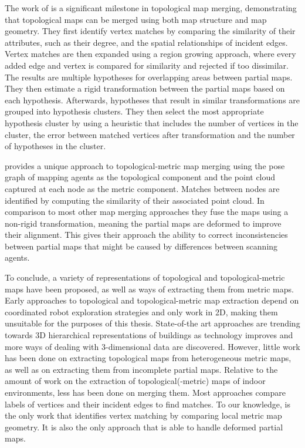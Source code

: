 The work of \citet{huang_topological_2005} is a significant milestone in topological map merging, demonstrating that topological maps can be merged using both map structure and map geometry. They first identify vertex matches by comparing the similarity of their attributes, such as their degree, and the spatial relationships of incident edges. Vertex matches are then expanded using a region growing approach, where every added edge and vertex is compared for similarity and rejected if too dissimilar. The results are multiple hypotheses for overlapping areas between partial maps. They then estimate a rigid transformation between the partial maps based on each hypothesis. Afterwards, hypotheses that result in similar transformations are grouped into hypothesis clusters. They then select the most appropriate hypothesis cluster by using a heuristic that includes the number of vertices in the cluster, the error between matched vertices after transformation and the number of hypotheses in the cluster.

\citet{bonanni_3-d_2017} provides a unique approach to topological-metric map merging using the pose graph of mapping agents as the topological component and the point cloud captured at each node as the metric component. Matches between nodes are identified by computing the similarity of their associated point cloud. In comparison to most other map merging approaches they fuse the maps using a non-rigid transformation, meaning the partial maps are deformed to improve their alignment. This gives their approach the ability to correct inconsistencies between partial maps that might be caused by differences between scanning agents.

To conclude, a variety of representations of topological and topological-metric maps have been proposed, as well as ways of extracting them from metric maps. Early approaches to topological and topological-metric map extraction depend on coordinated robot exploration strategies and only work in 2D, making them unsuitable for the purposes of this thesis. State-of-the art approaches are trending towards 3D hierarchical representations of buildings as technology improves and more ways of dealing with 3-dimensional data are discovered. However, little work has been done on extracting topological maps from heterogeneous metric maps, as well as on extracting them from incomplete partial maps. 
Relative to the amount of work on the extraction of topological(-metric) maps of indoor environments, less has been done on merging them. Most approaches compare labels of vertices and their incident edges to find matches. To our knowledge, \citet{bonanni_3-d_2017} is the only work that identifies vertex matching by comparing local metric map geometry. It is also the only approach that is able to handle deformed partial maps. 







